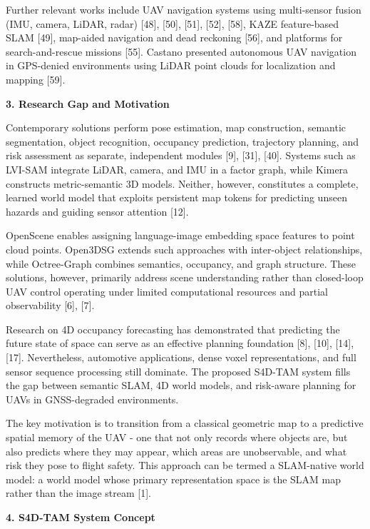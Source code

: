 \documentclass[
]{article}
\begin{document}
Further relevant works include UAV navigation systems using multi-sensor
fusion (IMU, camera, LiDAR, radar) {[}48{]}, {[}50{]}, {[}51{]},
{[}52{]}, {[}58{]}, KAZE feature-based SLAM {[}49{]}, map-aided
navigation and dead reckoning {[}56{]}, and platforms for
search-and-rescue missions {[}55{]}. Castano presented autonomous UAV
navigation in GPS-denied environments using LiDAR point clouds for
localization and mapping {[}59{]}.

\textbf{3. Research Gap and Motivation}

Contemporary solutions perform pose estimation, map construction,
semantic segmentation, object recognition, occupancy prediction,
trajectory planning, and risk assessment as separate, independent
modules {[}9{]}, {[}31{]}, {[}40{]}. Systems such as LVI-SAM integrate
LiDAR, camera, and IMU in a factor graph, while Kimera constructs
metric-semantic 3D models. Neither, however, constitutes a complete,
learned world model that exploits persistent map tokens for predicting
unseen hazards and guiding sensor attention {[}12{]}.

OpenScene enables assigning language-image embedding space features to
point cloud points. Open3DSG extends such approaches with inter-object
relationships, while Octree-Graph combines semantics, occupancy, and
graph structure. These solutions, however, primarily address scene
understanding rather than closed-loop UAV control operating under
limited computational resources and partial observability {[}6{]},
{[}7{]}.

Research on 4D occupancy forecasting has demonstrated that predicting
the future state of space can serve as an effective planning foundation
{[}8{]}, {[}10{]}, {[}14{]}, {[}17{]}. Nevertheless, automotive
applications, dense voxel representations, and full sensor sequence
processing still dominate. The proposed S4D-TAM system fills the gap
between semantic SLAM, 4D world models, and risk-aware planning for UAVs
in GNSS-degraded environments.

The key motivation is to transition from a classical geometric map to a
predictive spatial memory of the UAV - one that not only records where
objects are, but also predicts where they may appear, which areas are
unobservable, and what risk they pose to flight safety. This approach
can be termed a SLAM-native world model: a world model whose primary
representation space is the SLAM map rather than the image stream
{[}1{]}.

\textbf{4. S4D-TAM System Concept}
\end{document}
